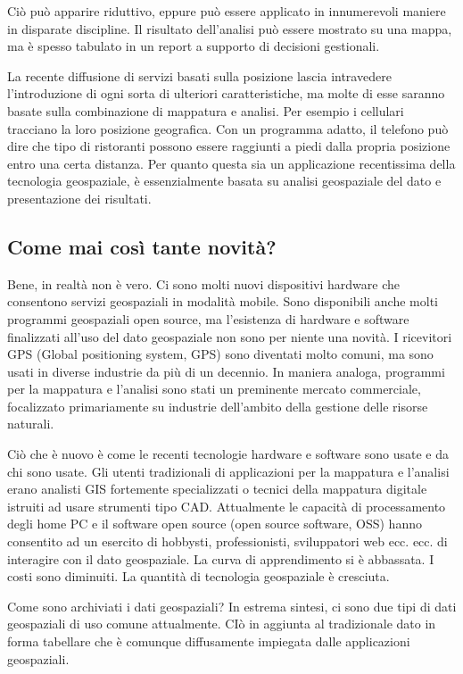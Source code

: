 Ciò può apparire riduttivo, eppure può essere applicato in innumerevoli
maniere in disparate discipline. Il risultato dell'analisi può essere
mostrato su una mappa, ma è spesso tabulato in un report a supporto
di decisioni gestionali.

La recente diffusione di servizi basati sulla posizione lascia intravedere
l'introduzione di ogni sorta di ulteriori caratteristiche, ma molte
di esse saranno basate sulla combinazione di mappatura e analisi.
Per esempio i cellulari tracciano la loro posizione geografica. Con
un programma adatto, il telefono può dire che tipo di ristoranti possono
essere raggiunti a piedi dalla propria posizione entro una certa distanza.
Per quanto questa sia un applicazione recentissima della tecnologia geospaziale,
è essenzialmente basata su analisi geospaziale del dato e presentazione
dei risultati.

\subsection{Come mai così tante novità?}\label{label_whynew}

Bene, in realtà non è vero. Ci sono molti nuovi dispositivi hardware
che consentono servizi geospaziali in modalità mobile. Sono disponibili
anche molti programmi geospaziali open source, ma l'esistenza di hardware
e software finalizzati all'uso del dato geospaziale non sono per niente una
novità. I ricevitori GPS (Global positioning system, GPS) sono diventati
molto comuni, ma sono usati in diverse industrie da più di un decennio.
In maniera analoga, programmi per la mappatura e l'analisi sono stati
un preminente mercato commerciale, focalizzato primariamente su industrie
dell'ambito della gestione delle risorse naturali.

Ciò che è nuovo è come le recenti tecnologie hardware e software sono
usate e da chi sono usate. Gli utenti tradizionali di applicazioni
per la mappatura e l'analisi erano analisti GIS fortemente specializzati
o tecnici della mappatura digitale istruiti ad usare strumenti tipo
CAD. Attualmente le capacità di processamento degli home PC e il software
open source (open source software, OSS) hanno consentito ad un esercito
di hobbysti, professionisti, sviluppatori web ecc. ecc. di interagire
con il dato geospaziale. La curva di apprendimento si è abbassata.
I costi sono diminuiti. La quantità di tecnologia geospaziale è cresciuta.

Come sono archiviati i dati geospaziali? In estrema sintesi, ci sono
due tipi di dati geospaziali di uso comune attualmente. CIò in aggiunta
al tradizionale dato in forma tabellare che è comunque diffusamente
impiegata dalle applicazioni geospaziali.

